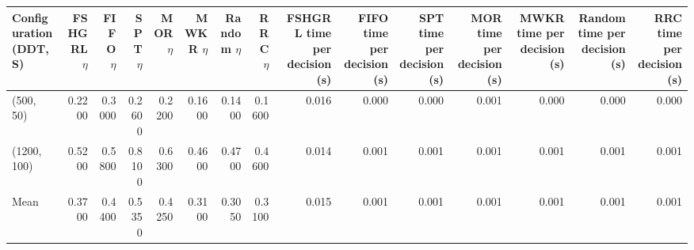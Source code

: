\begin{tabular}{lrrrrrrrrrrrrrr}
\toprule
Configuration (DDT, S) & FSHGRL $\eta$ & FIFO $\eta$ & SPT $\eta$ & MOR $\eta$ & MWKR $\eta$ & Random $\eta$ & RRC $\eta$ & FSHGRL time per decision (s) & FIFO time per decision (s) & SPT time per decision (s) & MOR time per decision (s) & MWKR time per decision (s) & Random time per decision (s) & RRC time per decision (s) \\
\midrule
(500, 50) & 0.2200 & 0.3000 & 0.2600 & 0.2200 & 0.1600 & 0.1400 & 0.1600 & 0.016 & 0.000 & 0.000 & 0.001 & 0.000 & 0.000 & 0.000 \\
(1200, 100) & 0.5200 & 0.5800 & 0.8100 & 0.6300 & 0.4600 & 0.4700 & 0.4600 & 0.014 & 0.001 & 0.001 & 0.001 & 0.001 & 0.001 & 0.001 \\
Mean & 0.3700 & 0.4400 & 0.5350 & 0.4250 & 0.3100 & 0.3050 & 0.3100 & 0.015 & 0.001 & 0.001 & 0.001 & 0.001 & 0.001 & 0.001 \\
\bottomrule
\end{tabular}
